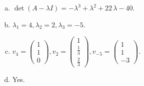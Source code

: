 \begin{questions}
\begin{solution}
\begin{enumerate}[(a)]
\item $\det(A-\lambda I)=-{\lambda}^{3} + {\lambda}^{2} + 22 \, {\lambda} - 40$.
\item ${\lambda}_1=4, {\lambda}_2=2, {\lambda}_3=-5$.
\item $v_{4}=\left(\begin{array}{r}
1 \\
1 \\
0
\end{array}\right), v_{2}=\left(\begin{array}{r}
1 \\
\frac{1}{3} \\
\frac{2}{3}
\end{array}\right), v_{-5}=\left(\begin{array}{r}
1 \\
1 \\
-3
\end{array}\right)$.
\item Yes.
\end{enumerate}
\end{solution}

\end{questions}

\newpage


\begin{center}
\end{center}


